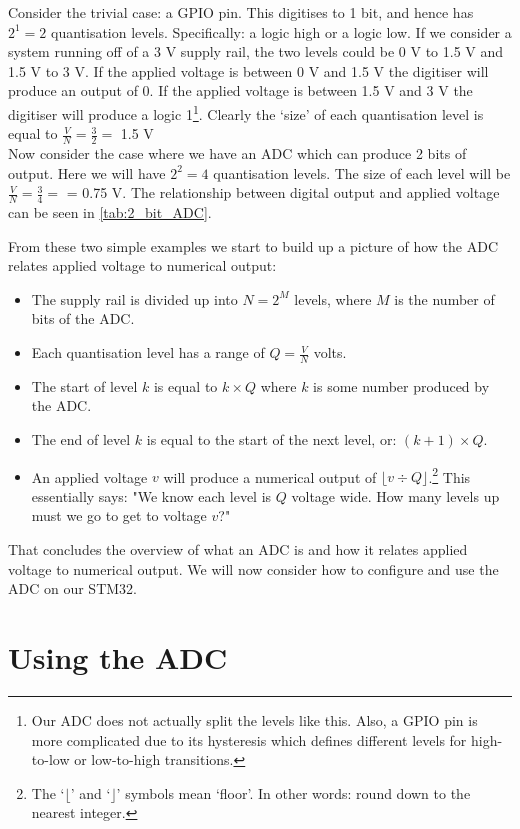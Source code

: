 Consider the trivial case: a GPIO pin. This digitises to 1 bit, and hence has $2^1 = 2$ quantisation levels. Specifically: a logic high or a logic low.
If we consider a system running off of a 3 V supply rail, the two levels could be 0 V to 1.5 V and 1.5 V to 3 V. If the applied voltage is between 0 V and 1.5 V the digitiser will produce an output of 0. If the applied voltage is between 1.5 V and 3 V the digitiser will produce a logic 1\footnote{Our ADC does not actually split the levels like this. Also, a GPIO pin is more complicated due to its hysteresis which defines different levels for high-to-low or low-to-high transitions.}. Clearly the `size' of each quantisation level is equal to $\frac{V}{N} = \frac{3}{2} = $ 1.5 V \\

Now consider the case where we have an ADC which can produce 2 bits of output. Here we will have $2^2 = 4$ quantisation levels. The size of each level will be $\frac{V}{N} = \frac{3}{4} =$ = 0.75 V. The relationship between digital output and applied voltage can be seen in \autoref{tab:2_bit_ADC}.


From these two simple examples we start to build up a picture of how the ADC relates applied voltage to numerical output:
\begin{itemize}
\item The supply rail is divided up into $N = 2^M$ levels, where $M$ is the number of bits of the ADC.
\item Each quantisation level has a range of $Q = \frac{V}{N}$ volts.
\item The start of level $k$ is equal to $k \times Q$ where $k$ is some number produced by the ADC.
\item The end of level $k$ is equal to the start of the next level, or: $(k+1) \times Q$.
\item An applied voltage $v$ will produce a numerical output of $\lfloor v \div Q \rfloor $.\footnote{The `$\lfloor$' and `$\rfloor$' symbols mean `floor'. In other words: round down to the nearest integer.} This essentially says: "We know each level is $Q$ voltage wide. How many levels up must we go to get to voltage $v$?"
\end{itemize}

That concludes the overview of what an ADC is and how it relates applied voltage to numerical output. We will now consider how to configure and use the ADC on our STM32.

\section{Using the ADC}
